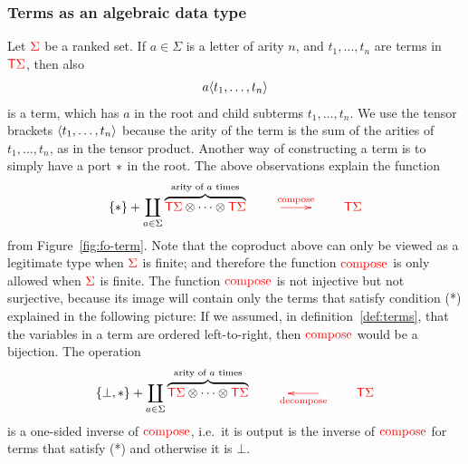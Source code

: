 \subsubsection{Terms as an algebraic data type} Let ${\color{red}{\Sigma}}$ be a ranked set. If $a \in \Sigma$ is a letter of arity $n$, and $t_1,\ldots,t_n$ are terms in ${\color{red}{\mathsf T}} {\color{red}{\Sigma}}$, then also 
\begin{align*}
    a \langle{t_1,\ldots,t_n}\rangle
\end{align*}
is a term, which has $a$ in the root and child subterms $t_1,\ldots,t_n$. We use the tensor brackets $\langle{t_1,\ldots,t_n}\rangle$ because the arity of the term is the sum of the arities of $t_1,\ldots,t_n$, as in the tensor product. Another way of constructing a term is to simply have a port $*$ in the root. The above observations explain the function 
\begin{align*}     
    \set * + \coprod_{a \in \Sigma} \overbrace{\tmonad \rSigma \otimes \cdots \otimes \tmonad \rSigma}^{\text{arity of $a$ times}}   \qquad \ranked{\xymatrix{
        \ar[r]^{\composeterm}& 
    }} \qquad \tmonad \rSigma
\end{align*}
from Figure~\ref{fig:fo-term}. Note that the coproduct above can only be viewed as a legitimate type when ${\color{red}{\Sigma}}$ is finite; and therefore the function ${\color{red}{\mathrm{compose}}}$ is only allowed when ${\color{red}{\Sigma}}$ is finite. The function ${\color{red}{\mathrm{compose}}}$ is not injective but not surjective, because its image will contain only the terms that satisfy condition (*) explained in the following picture: 
If we assumed, in definition~\ref{def:terms}, that the variables in a term are ordered left-to-right, then ${\color{red}{\mathrm{compose}}}$ would be a bijection. The operation 
\begin{align*}     
    \set {\bot,*} + \coprod_{a \in \Sigma} \overbrace{\tmonad \rSigma \otimes \cdots \otimes \tmonad \rSigma}^{\text{arity of $a$ times}}   \qquad \ranked{\xymatrix{
&          \ar[l]^{\decomposeterm} 
    }} \qquad \tmonad \rSigma
\end{align*}
is a one-sided inverse of ${\color{red}{\mathrm{compose}}}$, i.e.~it is output is the inverse of ${\color{red}{\mathrm{compose}}}$ for terms that satisfy (*) and otherwise it is $\bot$. 


